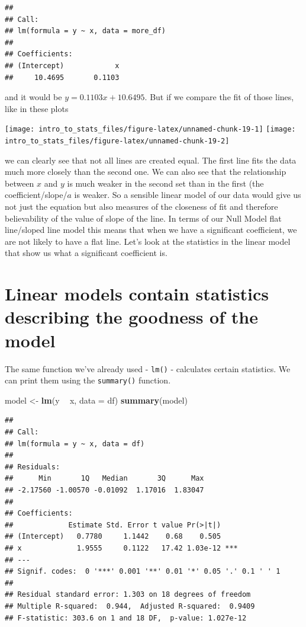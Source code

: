 \documentclass[
]{book}
\newenvironment{Shaded}{\begin{snugshade}}{\end{snugshade}}
\newcommand{\DataTypeTok}[1]{\textcolor[rgb]{0.13,0.29,0.53}{#1}}
\newcommand{\KeywordTok}[1]{\textcolor[rgb]{0.13,0.29,0.53}{\textbf{#1}}}
\newcommand{\NormalTok}[1]{#1}
\newcommand{\OperatorTok}[1]{\textcolor[rgb]{0.81,0.36,0.00}{\textbf{#1}}}
\newcommand{\StringTok}[1]{\textcolor[rgb]{0.31,0.60,0.02}{#1}}
\begin{document}
\begin{verbatim}
## 
## Call:
## lm(formula = y ~ x, data = more_df)
## 
## Coefficients:
## (Intercept)            x  
##     10.4695       0.1103
\end{verbatim}

and it would be \(y = 0.1103x + 10.6495\). But if we compare the fit of those lines, like in these plots

\texttt{[image: intro\_to\_stats\_files/figure-latex/unnamed-chunk-19-1]} \texttt{[image: intro\_to\_stats\_files/figure-latex/unnamed-chunk-19-2]}

we can clearly see that not all lines are created equal. The first line fits the data much more closely than the second one. We can also see that the relationship between \(x\) and \(y\) is much weaker in the second set than in the first (the coefficient/slope/\(a\) is weaker. So a sensible linear model of our data would give us not just the equation but also measures of the closeness of fit and therefore believability of the value of slope of the line. In terms of our Null Model flat line/sloped line model this means that when we have a significant coefficient, we are not likely to have a flat line. Let's look at the statistics in the linear model that show us what a significant coefficient is.

\hypertarget{linear-models-contain-statistics-describing-the-goodness-of-the-model}{%
\section{Linear models contain statistics describing the goodness of the model}\label{linear-models-contain-statistics-describing-the-goodness-of-the-model}}

The same function we've already used - \texttt{lm()} - calculates certain statistics. We can print them using the \texttt{summary()} function.

\begin{Shaded}
\begin{Highlighting}[]
\NormalTok{model <-}\StringTok{ }\KeywordTok{lm}\NormalTok{(y }\OperatorTok{~}\StringTok{ }\NormalTok{x, }\DataTypeTok{data =}\NormalTok{ df)}
\KeywordTok{summary}\NormalTok{(model)}
\end{Highlighting}
\end{Shaded}

\begin{verbatim}
## 
## Call:
## lm(formula = y ~ x, data = df)
## 
## Residuals:
##      Min       1Q   Median       3Q      Max 
## -2.17560 -1.00570 -0.01092  1.17016  1.83047 
## 
## Coefficients:
##             Estimate Std. Error t value Pr(>|t|)    
## (Intercept)   0.7780     1.1442    0.68    0.505    
## x             1.9555     0.1122   17.42 1.03e-12 ***
## ---
## Signif. codes:  0 '***' 0.001 '**' 0.01 '*' 0.05 '.' 0.1 ' ' 1
## 
## Residual standard error: 1.303 on 18 degrees of freedom
## Multiple R-squared:  0.944,	Adjusted R-squared:  0.9409 
## F-statistic: 303.6 on 1 and 18 DF,  p-value: 1.027e-12
\end{verbatim}
\end{document}
